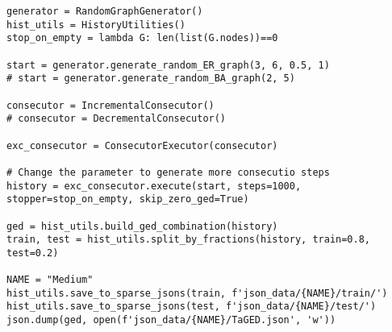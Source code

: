 \begin{lstlisting}[label={code:dataset_generation_example}, caption={Dataset Generation Example}]
generator = RandomGraphGenerator()
hist_utils = HistoryUtilities()
stop_on_empty = lambda G: len(list(G.nodes))==0

start = generator.generate_random_ER_graph(3, 6, 0.5, 1)
# start = generator.generate_random_BA_graph(2, 5)

consecutor = IncrementalConsecutor()
# consecutor = DecrementalConsecutor()

exc_consecutor = ConsecutorExecutor(consecutor)

# Change the parameter to generate more consecutio steps
history = exc_consecutor.execute(start, steps=1000, stopper=stop_on_empty, skip_zero_ged=True)

ged = hist_utils.build_ged_combination(history)
train, test = hist_utils.split_by_fractions(history, train=0.8, test=0.2)

NAME = "Medium"
hist_utils.save_to_sparse_jsons(train, f'json_data/{NAME}/train/')
hist_utils.save_to_sparse_jsons(test, f'json_data/{NAME}/test/')
json.dump(ged, open(f'json_data/{NAME}/TaGED.json', 'w'))
\end{lstlisting}